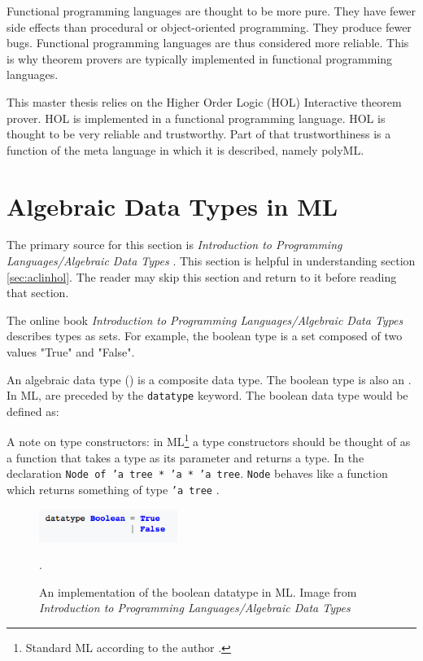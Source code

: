 \documentclass[../../main/main.tex]{subfiles}
\begin{document}
Functional programming languages are thought to be more pure.  They have fewer side effects than procedural or object-oriented programming.  They produce fewer bugs.  Functional programming languages are thus considered more reliable. This is why theorem provers are typically implemented in functional programming languages.  

This master thesis relies on the Higher Order Logic (HOL) Interactive theorem prover.  HOL is implemented in a functional programming language.  HOL is thought to be very reliable and trustworthy.  Part of that trustworthiness is a function of the meta language in which it is described, namely polyML.

\section{Algebraic Data Types in ML}\label{adt}\label{sec:adtinml}
The primary source for this section is \textit{Introduction to Programming Languages/Algebraic  Data Types} \cite{types}.  This section is helpful in understanding section \ref{sec:aclinhol}.  The reader may skip this section and return to it before reading that section.

The online book \textit{Introduction to Programming Languages/Algebraic  Data Types} describes types as sets.  For example, the boolean type is a set composed of two values "True" and "False".  

An algebraic data type () is a composite data type.  The boolean type is also an .  In ML,  are preceded by the \texttt{datatype} keyword.  The boolean data type would be defined as:

A note on type constructors: in ML\footnote{Standard ML according to the author \cite{constructor}.} a type constructors should be thought of as a function that takes a type as its parameter and returns a type.  In the declaration \texttt{Node of 'a tree * 'a * 'a tree}. \texttt{Node} behaves like a function which returns something of type \texttt{'a tree} \cite{constructor}.  

\begin{figure}[h]
\centering
\includegraphics[width=0.4\textwidth]{../figures/booladt}
\caption{\label{booladt} An implementation of the boolean datatype in ML.  Image from \textit{Introduction to Programming Languages/Algebraic Data Types} \cite{types} }.  
\end{figure}
\end{document}
